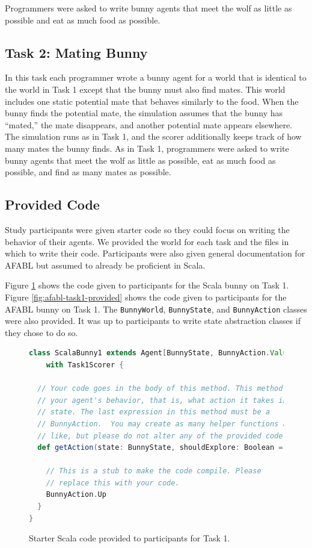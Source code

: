 Programmers were asked to write bunny agents that meet the wolf as little as possible and eat as much food as possible.

\subsection{Task 2: Mating Bunny}\label{sec:task2}

In this task each programmer wrote a bunny agent for a world that is identical to the world in Task 1 except that the bunny must also find mates.  This world includes one static  potential mate that behaves similarly to the food.  When the bunny finds the potential mate, the simulation assumes that the bunny has ``mated,'' the mate disappears, and another potential mate appears elsewhere.  The simulation runs as in Task 1, and the scorer additionally keeps track of how many mates the bunny finds.  As in Task 1, programmers were asked to write bunny agents that meet the wolf as little as possible, eat as much food as possible, and find as many mates as possible.

\subsection{Provided Code}

Study participants were given starter code so they could focus on writing the behavior of their agents. We provided the world for each task and the files in which to write their code. Participants were also given general documentation for AFABL but assumed to already be proficient in Scala.

Figure \ref{fig:scala-task1-provided} shows the code given to participants for the Scala bunny on Task 1. Figure \ref{fig:afabl-task1-provided} shows the code given to participants for the AFABL bunny on Task 1. The {\tt BunnyWorld}, {\tt BunnyState}, and {\tt BunnyAction} classes were also provided. It was up to participants to write state abstraction classes if they chose to do so.


\begin{figure}[!h]
\begin{center}

\begin{lstlisting}[language=Scala]
class ScalaBunny1 extends Agent[BunnyState, BunnyAction.Value]
    with Task1Scorer {

  // Your code goes in the body of this method. This method defines
  // your agent's behavior, that is, what action it takes in a given
  // state. The last expression in this method must be a
  // BunnyAction.  You may create as many helper functions as you
  // like, but please do not alter any of the provided code.
  def getAction(state: BunnyState, shouldExplore: Boolean = false) = {

    // This is a stub to make the code compile. Please
    // replace this with your code.
    BunnyAction.Up
  }
}
\end{lstlisting}

\caption{Starter Scala code provided to participants for Task 1.}
\end{center}
\label{fig:scala-task1-provided}
\end{figure}


